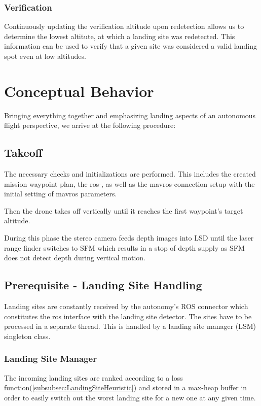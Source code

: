 \subsubsection{Verification}

Continuously updating the verification altitude upon redetection allows us to determine the lowest altitute, at which a landing site was redetected. This information can be used to verify that a given site was considered a valid landing spot even at low altitudes. 

\section{Conceptual Behavior}

Bringing everything together and emphasizing landing aspects of an autonomous flight perspective, we arrive at the following procedure:

\subsection{Takeoff}

The necessary checks and initializations are performed. This includes the created mission waypoint plan, the ros-, as well as the mavros-connection setup with the initial setting of mavros parameters.

Then the drone takes off vertically until it reaches the first waypoint's target altitude.

During this phase the stereo camera feeds depth images into LSD until the laser range finder switches to SFM which results in a stop of depth supply as SFM does not detect depth during vertical motion.

\subsection{Prerequisite - Landing Site Handling}

Landing sites are constantly received by the autonomy's ROS connector which constitutes the ros interface with the landing site detector. The sites have to be processed in a separate thread. This is handled by a landing site manager (LSM) singleton class.

\subsubsection{Landing Site Manager}

The incoming landing sites are ranked according to a loss function(\ref{subsubsec:LandingSiteHeuristic}) and stored in a max-heap buffer in order to easily switch out the worst landing site for a new one at any given time.

